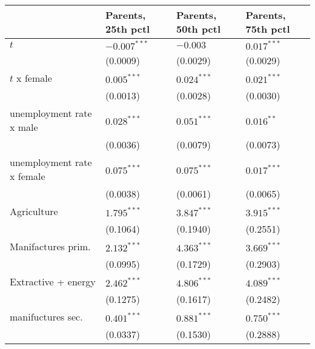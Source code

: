 \begin{tabular}{llll}
\toprule
{} & Parents, 25th pctl & Parents, 50th pctl & Parents, 75th pctl \\
\midrule
$t$                                                &     $-0.007^{***}$ &           $-0.003$ &      $0.017^{***}$ \\
                                                   &           (0.0009) &           (0.0029) &           (0.0029) \\
$t$ x female                                       &      $0.005^{***}$ &      $0.024^{***}$ &      $0.021^{***}$ \\
                                                   &           (0.0013) &           (0.0028) &           (0.0030) \\
unemployment rate x male                           &      $0.028^{***}$ &      $0.051^{***}$ &       $0.016^{**}$ \\
                                                   &           (0.0036) &           (0.0079) &           (0.0073) \\
unemployment rate x female                         &      $0.075^{***}$ &      $0.075^{***}$ &      $0.017^{***}$ \\
                                                   &           (0.0038) &           (0.0061) &           (0.0065) \\
Agriculture                                        &      $1.795^{***}$ &      $3.847^{***}$ &      $3.915^{***}$ \\
                                                   &           (0.1064) &           (0.1940) &           (0.2551) \\
Manifactures prim.                                 &      $2.132^{***}$ &      $4.363^{***}$ &      $3.669^{***}$ \\
                                                   &           (0.0995) &           (0.1729) &           (0.2903) \\
Extractive + energy                                &      $2.462^{***}$ &      $4.806^{***}$ &      $4.089^{***}$ \\
                                                   &           (0.1275) &           (0.1617) &           (0.2482) \\
manifuctures sec.                                  &      $0.401^{***}$ &      $0.881^{***}$ &      $0.750^{***}$ \\
                                                   &           (0.0337) &           (0.1530) &           (0.2888) \\

\end{tabular}
